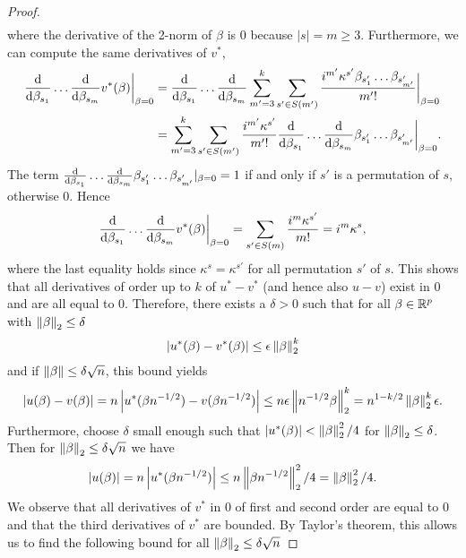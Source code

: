 \begin{proof}
\begin{align*}
    \end{align*}
    where the derivative of the 2-norm of $\beta$ is 0 because $|s| = m \geq 3$. Furthermore, we can compute the same derivatives of $v^*$,
    \begin{align*}
        \frac{\text{d}}{\text{d} \beta_{s_1}}\ldots\frac{\text{d}}{\text{d} \beta_{s_m}} v^*(\beta) \bigg|_{\beta=0}
        &= \frac{\text{d}}{\text{d} \beta_{s_1}}\ldots\frac{\text{d}}{\text{d} \beta_{s_m}} \sum_{m'=3}^k \sum_{s' \in S(m')} \frac{i^{m'}\kappa^{s'}\beta_{s'_1}\ldots\beta_{s'_{m'}}}{m'!} \bigg|_{\beta=0} \\
        &= \sum_{m'=3}^k \sum_{s' \in S(m')} \frac{i^{m'}\kappa^{s'}}{m'!} \frac{\text{d}}{\text{d} \beta_{s_1}}\ldots\frac{\text{d}}{\text{d} \beta_{s_m}}\beta_{s'_1}\ldots\beta_{s'_{m'}} \bigg|_{\beta=0}.
    \end{align*}
    The term $\frac{\text{d}}{\text{d} \beta_{s_1}}\ldots\frac{\text{d}}{\text{d} \beta_{s_m}}\beta_{s'_1}\ldots\beta_{s'_{m'}} |_{\beta=0} = 1$ if and only if $s'$ is a permutation of $s$, otherwise 0. Hence
    \begin{equation*}
        \frac{\text{d}}{\text{d} \beta_{s_1}}\ldots\frac{\text{d}}{\text{d} \beta_{s_m}} v^*(\beta) \bigg|_{\beta=0} 
        = \sum_{s' \in S(m)} \frac{i^m\kappa^{s'}}{m!}
        = i^m\kappa^s,
    \end{equation*}
    where the last equality holds since $\kappa^s = \kappa^{s'}$ for all permutation $s'$ of $s$. 
    This shows that all derivatives of order up to $k$ of $u^* - v^*$ (and hence also $u - v$) exist in 0 and are all equal to 0. Therefore, there exists a $\delta > 0$ such that for all $\beta \in \mathbb{R}^p$ with $\left\lVert\beta\right\rVert_2 \leq \delta$
    \begin{equation*}
        \left|u^*(\beta) - v^*(\beta)\right| \leq \epsilon\left\lVert\beta\right\rVert_2^k
    \end{equation*}
    and if $\left\lVert\beta\right\rVert \leq \delta \sqrt{n}$, this bound yields
    \begin{equation*}
        \left|u(\beta) - v(\beta)\right| = n\left|u^*(\beta n^{-1/2}) - v(\beta n^{-1/2})\right| \leq n\epsilon\left\lVert n^{-1/2}\beta\right\rVert_2^k = n^{1-k/2}\left\lVert\beta\right\rVert_2^k\epsilon.
    \end{equation*}
    Furthermore, choose $\delta$ small enough such that $\left|u^*(\beta)\right| < \left\lVert\beta\right\rVert_2^2/4$ for $\left\lVert\beta\right\rVert_2 \leq \delta$. Then for $\left\lVert\beta\right\rVert_2 \leq \delta\sqrt{n}$ we have
    \begin{equation*}
        \left|u(\beta)\right| = n\left|u^*(\beta n^{-1/2})\right| \leq n \left\lVert\beta n^{-1/2}\right\rVert_2^2/4 = \left\lVert\beta\right\rVert_2^2/4.
    \end{equation*}
    We observe that all derivatives of $v^*$ in 0 of first and second order are equal to 0 and that the third derivatives of $v^*$ are bounded. By Taylor's theorem, this allows us to find the following bound for all $\left\lVert\beta\right\rVert_2 \leq \delta \sqrt{n}$

\end{proof}
